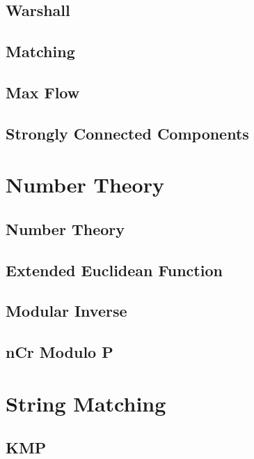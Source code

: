 \subsection{Warshall}
\raggedbottom
\hrulefill
\subsection{Matching}
\raggedbottom
\hrulefill
\subsection{Max Flow}
\raggedbottom
\hrulefill
\subsection{Strongly Connected Components}
\raggedbottom
\hrulefill

\section{Number Theory}
\subsection{Number Theory}
\raggedbottom
\hrulefill
\subsection{Extended Euclidean Function}
\raggedbottom
\hrulefill
\subsection{Modular Inverse}
\raggedbottom
\hrulefill
\subsection{nCr Modulo P}
\raggedbottom
\hrulefill

\section{String Matching}
\subsection{KMP}
\raggedbottom
\hrulefill
